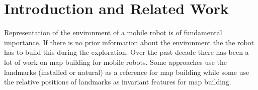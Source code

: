 \documentclass{article}
\begin{document}
\section{Introduction and Related Work}
Representation of the environment of a mobile robot is of
fundamental importance\cite{monkey}. If there is no prior information about the
environment the the robot has to build this during the exploration.
Over the past decade there has been a lot of work on map building
for mobile robots. Some approaches use the landmarks (installed or
natural) as a reference for map building while some use the relative
positions of landmarks as invariant features for map building\cite{monkey2}.








\end{document}
